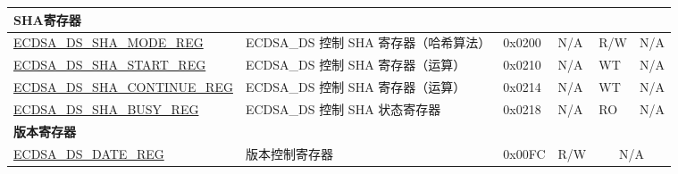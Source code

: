 \begin{small}
\begin{longtable}{ | p{5.2cm} | l | p{1.3cm} | l | l | l | l | }
\multicolumn{7}{|l|}{\textbf{SHA寄存器}} \\ \hline
\hyperref[regdesc:ECDSADSSHAMODEREG]{ECDSA\_DS\_SHA\_MODE\_REG} & ECDSA\_DS 控制 SHA 寄存器（哈希算法） & 0x0200 & N/A & R/W & \multicolumn{2}{|c|}{N/A} \\ \hline
\hyperref[regdesc:ECDSADSSHASTARTREG]{ECDSA\_DS\_SHA\_START\_REG} & ECDSA\_DS 控制 SHA 寄存器（运算） & 0x0210 & N/A & WT & \multicolumn{2}{|c|}{N/A} \\ \hline
\hyperref[regdesc:ECDSADSSHACONTINUEREG]{ECDSA\_DS\_SHA\_CONTINUE\_REG} & ECDSA\_DS 控制 SHA 寄存器（运算） & 0x0214 & N/A & WT & \multicolumn{2}{|c|}{N/A} \\ \hline
\hyperref[regdesc:ECDSADSSHABUSYREG]{ECDSA\_DS\_SHA\_BUSY\_REG} & ECDSA\_DS 控制 SHA 状态寄存器 & 0x0218 & N/A & RO & \multicolumn{2}{|c|}{N/A} \\ \hline
\multicolumn{7}{|l|}{\textbf{版本寄存器}} \\ \hline
\hyperref[regdesc:ECDSADSDATEREG]{ECDSA\_DS\_DATE\_REG} & 版本控制寄存器 & 0x00FC & R/W & \multicolumn{3}{|c|}{N/A} \\ \hline
\end{longtable}
\end{small}